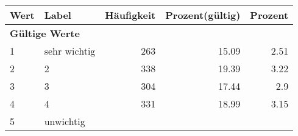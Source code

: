      \begin{longtable}{lXrrr}
     \toprule
     \textbf{Wert} & \textbf{Label} & \textbf{Häufigkeit} & \textbf{Prozent(gültig)} & \textbf{Prozent} \\
     \endhead
     \midrule
     \multicolumn{5}{l}{\textbf{Gültige Werte}}\\

     1 &
     \multicolumn{1}{X}{ sehr wichtig   } &


       \num{263} &
       \num[round-mode=places,round-precision=2]{15,09} &
         \num[round-mode=places,round-precision=2]{2,51} \\

     2 &
     \multicolumn{1}{X}{ 2   } &


       \num{338} &
       \num[round-mode=places,round-precision=2]{19,39} &
         \num[round-mode=places,round-precision=2]{3,22} \\

     3 &
     \multicolumn{1}{X}{ 3   } &


       \num{304} &
       \num[round-mode=places,round-precision=2]{17,44} &
         \num[round-mode=places,round-precision=2]{2,9} \\

     4 &
     \multicolumn{1}{X}{ 4   } &


       \num{331} &
       \num[round-mode=places,round-precision=2]{18,99} &
         \num[round-mode=places,round-precision=2]{3,15} \\

     5 &
     \multicolumn{1}{X}{ unwichtig   } &



\end{longtable}

